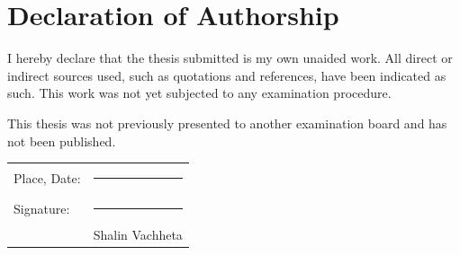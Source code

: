\chapter*{Declaration of Authorship}

I hereby declare that the thesis submitted is my own unaided work.
All direct or indirect sources used, such as quotations and references,
have been indicated as such.
This work was not yet subjected to any examination procedure.

This thesis was not previously presented to another examination board and
has not been published.

\vspace{3cm}

\noindent
\begin{tabular}{@{}ll@{}}
  Place, Date: & \rule{6cm}{0.4pt} \\[1.5cm]
  Signature:   & \rule{6cm}{0.4pt} \\[0.3cm]
               & Shalin Vachheta
\end{tabular}

\cleardoublepage
